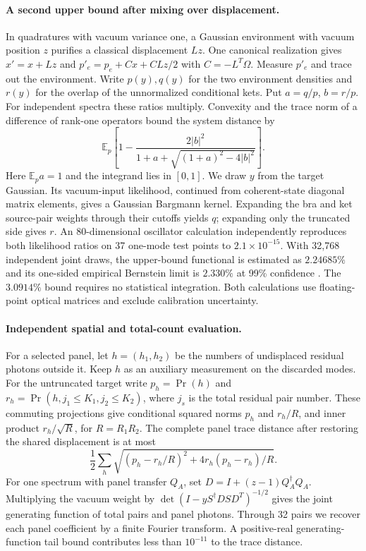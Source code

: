 \documentclass[11pt]{article}
\newcommand{\E}{\mathbb{E}}
\begin{document}
\paragraph{A second upper bound after mixing over displacement.}
In quadratures with vacuum variance one, a Gaussian environment with vacuum position $z$ purifies a classical displacement $Lz$. One canonical realization gives $x'=x+Lz$ and $p'_e=p_e+Cx+CLz/2$ with $C=-L^T\Omega$. Measure $p'_e$ and trace out the environment. Write $p(y),q(y)$ for the two environment densities and $r(y)$ for the overlap of the unnormalized conditional kets. Put $a=q/p$, $b=r/p$. For independent spectra these ratios multiply. Convexity and the trace norm of a difference of rank-one operators bound the system distance by
\[
  \E_p\left[1-\frac{2|b|^2}{1+a+\sqrt{(1+a)^2-4|b|^2}}\right].
\]
Here $\E_p a=1$ and the integrand lies in $[0,1]$. We draw $y$ from the target Gaussian. Its vacuum-input likelihood, continued from coherent-state diagonal matrix elements, gives a Gaussian Bargmann kernel. Expanding the bra and ket source-pair weights through their cutoffs yields $q$; expanding only the truncated side gives $r$. An 80-dimensional oscillator calculation independently reproduces both likelihood ratios on 37 one-mode test points to $2.1\times10^{-15}$. With 32,768 independent joint draws, the upper-bound functional is estimated as $2.24685\%$ and its one-sided empirical Bernstein limit is $2.330\%$ at 99\% confidence \cite{bernstein}. The $3.0914\%$ bound requires no statistical integration. Both calculations use floating-point optical matrices and exclude calibration uncertainty.

\paragraph{Independent spatial and total-count evaluation.}
For a selected panel, let $h=(h_1,h_2)$ be the numbers of undisplaced residual photons outside it. Keep $h$ as an auxiliary measurement on the discarded modes. For the untruncated target write $p_h=\Pr(h)$ and $r_h=\Pr(h, j_1\le K_1,j_2\le K_2)$, where $j_s$ is the total residual pair number. These commuting projections give conditional squared norms $p_h$ and $r_h/R$, and inner product $r_h/\sqrt R$, for $R=R_1R_2$. The complete panel trace distance after restoring the shared displacement is at most
\[
 \frac12\sum_h\sqrt{(p_h-r_h/R)^2+4r_h(p_h-r_h)/R}.
\]
For one spectrum with panel transfer $Q_A$, set $D=I+(z-1)Q_A^\dagger Q_A$. Multiplying the vacuum weight by $\det(I-yS^\dagger DS D^T)^{-1/2}$ gives the joint generating function of total pairs and panel photons. Through 32 pairs we recover each panel coefficient by a finite Fourier transform. A positive-real generating-function tail bound contributes less than $10^{-11}$ to the trace distance.
\end{document}

